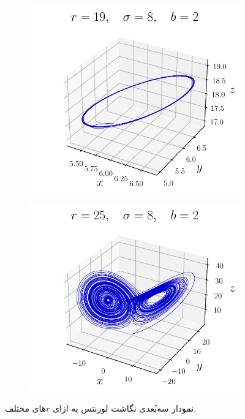 \documentclass[12pt,a4paper]{article}
\begin{document}
\begin{figure}[h!]
\begin{LTR}
\begin{subfigure}{0.49\linewidth}
			\end{subfigure}
			\begin{subfigure}{0.49\linewidth}
				\centering
				\includegraphics[width=\linewidth]{fig/lorenz3-3d}
			\end{subfigure}
			\begin{subfigure}{0.49\linewidth}
				\centering
				\includegraphics[width=\linewidth]{fig/lorenz4-3d}
			\end{subfigure}
		\end{LTR}
		\caption{نمودار سه‌بُعدی نگاشت لورنتس به ازای $r$های مختلف.}
	\end{figure}
\end{document}

